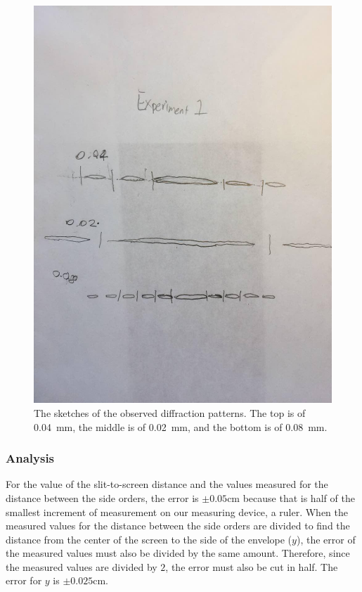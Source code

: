 \documentclass[12pt]{article}
\begin{document}
\begin{figure}[H]
  \label{pic:exp1}
  \begin{center}
    \includegraphics[scale=0.35]{exp1.jpg}
  \end{center}
  \caption{The sketches of the observed diffraction patterns. The top is of
    \SI{0.04}{\milli\meter}, the middle is of \SI{0.02}{\milli\meter}, and the
    bottom is of \SI{0.08}{\milli\meter}.}
\end{figure}

\subsubsection{Analysis}

\qq For the value of the slit-to-screen distance and the values measured for the
distance between the side orders, the error is \(\pm 0.05 \si{\centi\meter}\)
because that is half of the smallest increment of measurement on our measuring
device, a ruler. When the measured values for the distance between the side
orders are divided to find the distance from the center of the screen to the
side of the envelope (\(y\)), the error of the measured values must also be
divided by the same amount. Therefore, since the measured values are divided by
\(2\), the error must also be cut in half. The error for \(y\) is \(\pm 0.025
\si{\centi\meter}\).  
\end{document}

